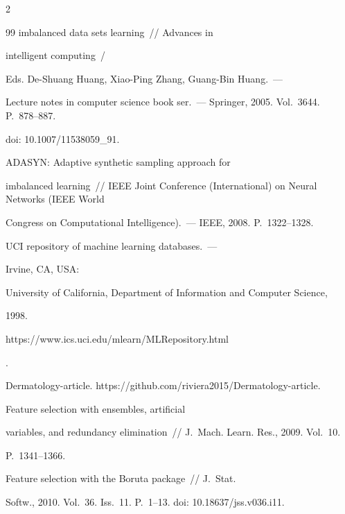 \begin{multicols}{2}
{{\begin{thebibliography}{99}
imbalanced data sets learning~// Advances in

intelligent computing~/

Eds. De-Shuang Huang, Xiao-Ping Zhang, Guang-Bin Huang.~--- 

Lecture notes in computer science book ser.~--- Springer, 2005. Vol.~3644. P.~878--887. 

doi: 10.1007/11538059\_91.




 ADASYN: Adaptive synthetic sampling approach for 

imbalanced learning~// IEEE  Joint Conference (International) on Neural Networks (IEEE World 

Congress on Computational Intelligence).~--- IEEE, 2008. P.~1322--1328.




 UCI repository of machine learning databases.~--- 

Irvine, CA, USA: 

University of California, Department of Information and Computer Science, 

1998. {\sf 

https://www.ics.uci.edu/mlearn/\linebreak MLRepository.html}.






Dermatology-article. {\sf https://github.com/riviera2015/\linebreak Dermatology-article}.


 Feature selection with ensembles, artificial 

variables, and redundancy elimination~// J.~Mach. Learn. Res., 2009. Vol.~10.  

P.~1341--1366.




 Feature selection with the Boruta package~// J.~Stat. 

Softw.,  2010. Vol.~36. Iss.~11. P.~1--13. doi: 10.18637/jss.v036.i11.



 \end{thebibliography}



 }

 }



\end{multicols}



